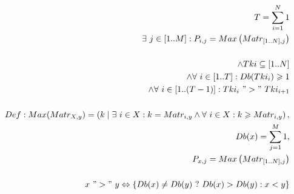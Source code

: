 \documentclass[a4paper,10pt]{article}
\begin{document}
\begin{align*}

T=\sum_{i=1}^{N}1  \\
\exists \  j\in \left [ 1..M \right ] : P_{i,j}=Max\left(Matr_{\left [ 1..N \right ], j}\right) \\\\
\wedge Tki\subseteq \left [1..N \right ] \\
\wedge \forall \  i\in \left[1..T \right ]:Db(Tki_{i})\geqslant 1 \\
\wedge \forall \ i\in \left[1..(T-1) \right ]:Tki_{i}\ " > "\ Tki_{i+1} \\\\
Def: Max(Matr_{X,y})=\left (k\mid \exists \ i\in X: k= Matr_{i,y} \wedge \forall \ i \in X: k \geqslant Matr_{i,y} \right ),\\
Db(x)=\sum_{j=1}^{M}1,  \\
P_{x,j}=Max\left(Matr_{\left [ 1..N \right ],j}\right) \\\\
x\ " > "\ y \Leftrightarrow \left \{  Db(x) \neq Db(y)\ ?\  Db(x) > Db(y) : x<y \right \}

\end{align*}
\end{document}
